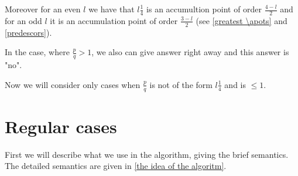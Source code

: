Moreover for an even $l$ we have that $l\frac{1}{4}$ is an accumultion point of order 
$\frac{4-l}{2}$ 
and for an odd $l$ it is an accumulation point of order $\frac{3-l}{2}$ (see \ref{greatest \apots} 
and \ref{predescors}). 

In the case, where $\frac{p}{q} > 1$, we also can give answer right away and this answer is "no". 

Now we will consider only cases when $\frac{p}{q}$ is not of the form $l\frac{1}{4}$ and is 
$\leq 1$.
%
%
%
%
%
%
\section{Regular cases}
First we will describe what we use in the algorithm, giving the brief semantics. 
The detailed semantics are given in \ref{the idea of the algoritm}.
